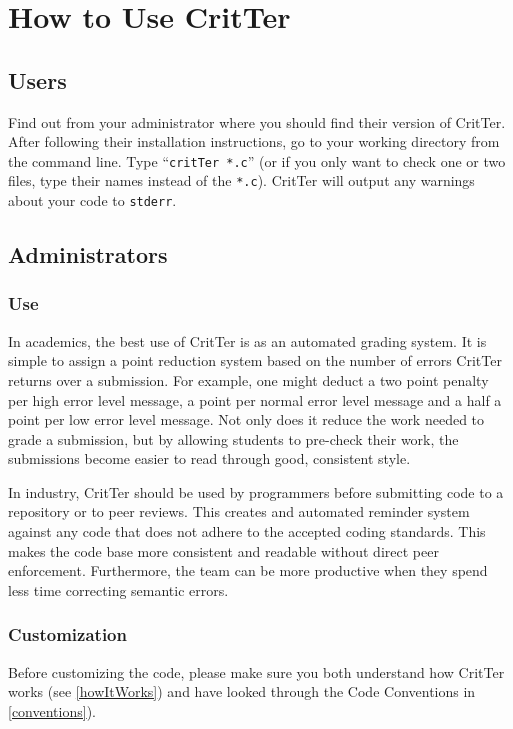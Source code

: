 \documentclass[12pt]{report}
\newcommand{\programName}{CritTer\xspace}
\begin{document}
\chapter{How to Use \programName}

\section{Users}
Find out from your administrator where you should find their version of \programName. After following 
their installation instructions, go to your working directory from the command line. Type 
``\lstinline{critTer *.c}'' (or if you only want to check one or two files, type their names instead of the 
\lstinline{*.c}).  \programName will output 
any warnings about your code to \lstinline{stderr}.

\section{Administrators}

\subsection{Use}
In academics, the best use of \programName is as an automated grading system. It is simple to assign a 
point reduction system based on the number of errors \programName returns over a submission. For 
example, one might deduct a two point penalty per high error level message, a point per normal error 
level message and a half a point per low error level message. Not only does it reduce the work needed 
to grade a submission, but by allowing students to pre-check their work, the submissions become easier 
to read through good, consistent style.

In industry, \programName should be used by programmers before submitting code to a repository or to 
peer reviews. This creates and automated reminder system against any code that does not adhere to the 
accepted coding standards. This makes the code base more consistent and readable without direct 
peer enforcement. Furthermore, the team can be more productive when they spend less time correcting 
semantic errors.

\subsection{Customization}
Before customizing the code, please make sure you both understand how \programName works (see 
\autoref{howItWorks}) and have looked through the Code 
Conventions in \autoref{conventions}).
\end{document}
